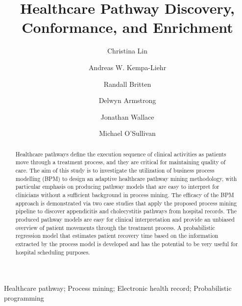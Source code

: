 \documentclass{elsarticle}
\newcommand{\wordcount}[2]{%
  (\immediate\write18{texcount -1 -sum -merge #1.tex > #1-words.sum }%
  /#2 words)%
}
\begin{document}
\newcommand{\plugin}[1]{\texttt{#1}}
\begin{frontmatter}

\title{Healthcare Pathway Discovery, Conformance, and Enrichment}


\author[mymainaddress]{Christina Lin}
\author[mymainaddress]{Andreas W. Kempa-Liehr}
\author[ADHB,Orion]{Randall Britten}
\author[Waitemata]{Delwyn Armstrong}
\author[Waitemata]{Jonathan Wallace}
\author[mymainaddress]{Michael O'Sullivan}

\address[mymainaddress]{Department of Engineering Science, The University of Auckland, 70 Symonds St, Auckland, New Zealand}
\address[ADHB]{Auckland District Health Board, 2 Park Road, Auckland, New Zealand}
\address[Orion]{was at Orion Health, 181 Grafton Rd, Auckland, New Zealand}

\address[Waitemata]{Waitemata District Health Board, 124 Shakespeare Rd, Auckland, New Zealand
}

\begin{abstract}
Healthcare pathways define the execution sequence of clinical
activities as patients move through a treatment process, and they are
critical for maintaining quality of care.
The aim of this study is to investigate the utilization of business process modelling (BPM) to design an adaptive healthcare pathway mining methodology, with particular emphasis on producing pathway models that are easy to interpret for clinicians without a sufficient background in process mining.
The efficacy of the BPM approach is demonstrated via two case studies
that apply the proposed process mining pipeline to discover
appendicitis and cholecystitis pathways from hospital records.
The produced pathway models are
easy for clinical interpretation and provide an unbiased overview of
patient movements through the treatment process.
A probabilistic regression model that estimates patient recovery time based on the information extracted by the process model is developed and has the potential to be very useful for hospital scheduling purposes.
\end{abstract}

\begin{keyword}
Healthcare pathway; Process mining; Electronic health record; Probabilistic programming
\end{keyword}

\end{frontmatter}
\end{document}
